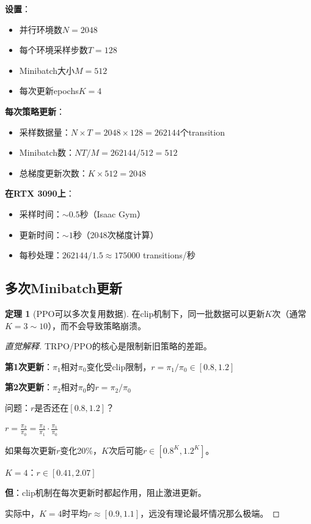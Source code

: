 \documentclass[11pt,a4paper]{article}
\theoremstyle{definition}
\newtheorem{theorem}{定理}[section]
\begin{document}
\begin{calculation}[PPO的吞吐量]
\textbf{设置}：
\begin{itemize}
    \item 并行环境数$N = 2048$
    \item 每个环境采样步数$T = 128$
    \item Minibatch大小$M = 512$
    \item 每次更新epochs$K = 4$
\end{itemize}

\textbf{每次策略更新}：
\begin{itemize}
    \item 采样数据量：$N \times T = 2048 \times 128 = 262144$个transition
    \item Minibatch数：$NT / M = 262144 / 512 = 512$
    \item 总梯度更新次数：$K \times 512 = 2048$
\end{itemize}

\textbf{在RTX 3090上}：
\begin{itemize}
    \item 采样时间：$\sim 0.5$秒（Isaac Gym）
    \item 更新时间：$\sim 1$秒（2048次梯度计算）
    \item 每秒处理：$262144 / 1.5 \approx 175000$ transitions/秒
\end{itemize}
\end{calculation}

\subsection{多次Minibatch更新}

\begin{theorem}[PPO可以多次复用数据]
在clip机制下，同一批数据可以更新$K$次（通常$K = 3 \sim 10$），而不会导致策略崩溃。
\end{theorem}

\begin{proof}[直觉解释]
TRPO/PPO的核心是限制新旧策略的差距。

\textbf{第1次更新}：$\pi_1$相对$\pi_0$变化受clip限制，$r = \pi_1/\pi_0 \in [0.8, 1.2]$

\textbf{第2次更新}：$\pi_2$相对$\pi_0$的$r = \pi_2/\pi_0$

问题：$r$是否还在$[0.8, 1.2]$？

$r = \frac{\pi_2}{\pi_0} = \frac{\pi_2}{\pi_1} \cdot \frac{\pi_1}{\pi_0}$

如果每次更新$r$变化20\%，$K$次后可能$r \in [0.8^K, 1.2^K]$。

$K = 4$：$r \in [0.41, 2.07]$

\textbf{但}：clip机制在每次更新时都起作用，阻止激进更新。

实际中，$K = 4$时平均$r \approx [0.9, 1.1]$，远没有理论最坏情况那么极端。
\end{proof}
\end{document}
